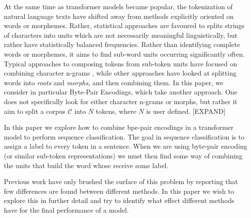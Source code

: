 \documentclass[11pt]{article}
\begin{document}
	At the same time as transformer models became popular, the
        tokenization of natural language texts have shifted away from
        methods explicitly oriented on words or morphemes. Rather,
        statistical approaches are favoured to splits strings of
        characters into units which are not necessarily meaningful
        linguistically, but rather have statistically balanced
        frequencies.
        Rather than identifying complete words or morphemes, it aims
        to find sub-word units occurring significantly often. Typical
        approaches to composing tokens from sub-token units have
        focused on combining character n-grams \cite{TODO:bojanowski},
        while other approaches have looked at splitting words into
        \textit{roots} and \textit{morphs}, and then
        combining them. In this paper, we consider in particular
        Byte-Pair Encodings, which take another approach. One does not
        specifically look for either character n-grams or morphs, but
        rather it aim to split a corpus $\mathcal{C}$ into $N$ tokens,
        where $N$ is user defined. [EXPAND]
	
	In this paper we explore how to combine bpe-pair encodings in a transformer model to perform sequence classification. The goal in sequence classification is to assign a label to every token in a sentence. When we are using byte-pair encoding (or similar sub-token representations) we must then find some way of combining the units that build the word whose receive some label. 
	
	Previous work have only brushed the surface of this problem by reporting that few differences are found between different methods. In this paper we wish to explore this in further detail and try to identify what effect different methods have for the final performance of a model.  
	
    
\end{document}
